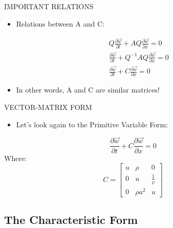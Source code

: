 \documentclass{beamer}
\begin{document}
\begin{frame}{IMPORTANT RELATIONS}
  \begin{itemize}
   \item Relations between A and C:
  \end{itemize}
  \begin{eqnarray}
   &&Q\frac{\partial{\vec{w}}}{\partial{t}}+AQ\frac{\partial{\vec{w}}}{\partial{x}}=0 \\
   &&\frac{\partial{\vec{w}}}{\partial{t}}+Q^{-1}AQ\frac{\partial{\vec{w}}}{\partial{x}}=0 \\
   &&\frac{\partial{\vec{w}}}{\partial{t}}+C\frac{\partial{\vec{w}}}{\partial{x}}=0
  \end{eqnarray}
  \begin{itemize}
   \item In other words, A and C are similar matrices!
  \end{itemize}
\end{frame}

\begin{frame}{VECTOR-MATRIX FORM}
  \begin{itemize}
   \item Let's look again to the Primitive Variable Form:
  \end{itemize}
  \begin{equation}
   \frac{\partial{\vec{w}}}{\partial{t}}+C\frac{\partial{\vec{w}}}{\partial{x}}=0
  \end{equation}
Where:
  \begin{equation}
   C=\begin{bmatrix}
    u & \rho & 0\\ 
    0 & u & \frac{1}{\rho}\\ 
    0 & {\rho}a^2 & u
    \end{bmatrix}
  \end{equation}
\end{frame}

\subsection{The Characteristic Form}
\end{document}
